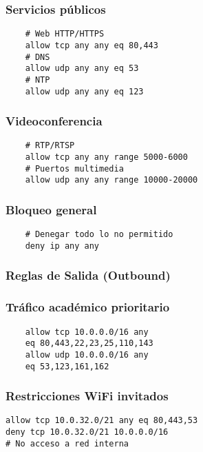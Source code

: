 \subsubsection*{Servicios públicos}
\begin{verbatim}
    # Web HTTP/HTTPS
    allow tcp any any eq 80,443
    # DNS
    allow udp any any eq 53
    # NTP
    allow udp any any eq 123
\end{verbatim}


\subsubsection*{Videoconferencia}
\begin{verbatim}
    # RTP/RTSP
    allow tcp any any range 5000-6000
    # Puertos multimedia
    allow udp any any range 10000-20000
\end{verbatim}


\subsubsection*{Bloqueo general}
\begin{verbatim}
    # Denegar todo lo no permitido
    deny ip any any
\end{verbatim}

\subsubsection{\textbf{Reglas de Salida (Outbound)}}

\subsubsection*{Tráfico académico prioritario}
\begin{verbatim}
    allow tcp 10.0.0.0/16 any
    eq 80,443,22,23,25,110,143
    allow udp 10.0.0.0/16 any
    eq 53,123,161,162
\end{verbatim}

\subsubsection*{Restricciones WiFi invitados}
\begin{verbatim}
allow tcp 10.0.32.0/21 any eq 80,443,53
deny tcp 10.0.32.0/21 10.0.0.0/16
# No acceso a red interna
\end{verbatim}



